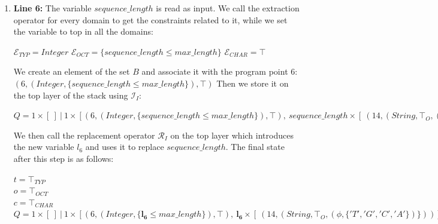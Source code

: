 \documentclass[10pt]{report}
\begin{document}
\begin{enumerate}
\begin{center}
	\end{center}
	\item \textbf{Line 6:} The variable $ sequence\_length $ is read as input. We call the extraction operator for every domain to get the constraints related to it, while we set the variable to top in all the domains: 
	\begin{center}
		$ \mathcal{E}_{TYP} = Integer $
		$ \mathcal{E}_{OCT} = \lbrace sequence\_length \leq max\_length \rbrace $
		$ \mathcal{E}_{CHAR} = \top $
	\end{center}
	We create an element of the set $ B $ and associate it with the program point 6:
	$ (6, (Integer, \lbrace sequence\_length \leq max\_length \rbrace ), \top) $
	Then we store it on the top layer of the stack using $ \mathcal{I}_{I} $: 
	\begin{center}
		$ Q = 1 \times [\ ]\ \vert\ 1 \times [(6, (Integer, \lbrace sequence\_length \leq max\_length \rbrace ), \top), \ sequence\_length \times [\ (14, (String, \top_{O}, (\phi, \lbrace'T', 'G', 'C', 'A' \rbrace) \rbrace))], (25, (String, \top_{O}, (\phi, \lbrace '\#', '.' \rbrace)))]$
	\end{center}
	
	We then call the replacement operator $ \mathcal{R}_{I} $ on the top layer which introduces the new variable $ l_{6} $ and uses it to replace $ sequence\_length $. The final state after this step is as follows:
	\begin{center}
		$ t = \top_{TYP} $ \\
		$ o = \top_{OCT} $\\
		$ c = \top_{CHAR} $ \\
		$ Q = 1 \times [\ ]\ \vert\ 1 \times [(6, (Integer, \lbrace \mathbf{l_{6}} \leq max\_length \rbrace ), \top), \ \mathbf{l_{6}} \times [\ (14, (String, \top_{O}, (\phi, \lbrace'T', 'G', 'C', 'A' \rbrace) \rbrace))], (25, (String, \top_{O}, (\phi, \lbrace '\#', '.' \rbrace)))]$
	\end{center}
	

\end{enumerate}
\end{document}
